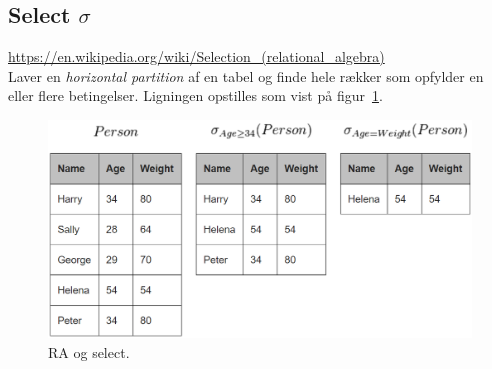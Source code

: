 \subsection{Select $\sigma$}

\url{https://en.wikipedia.org/wiki/Selection_(relational_algebra)}\\

Laver en \textit{horizontal partition} af en tabel og finde hele rækker som opfylder en eller flere betingelser. Ligningen opstilles som vist på figur~\ref{fig:select}.

\begin{figure}[H]
	\centering
	\includegraphics[width=0.8\linewidth]{figs/spm6/select}
	\caption{RA og select.}
	\label{fig:select}
\end{figure}

%
%
%
%
%
%
